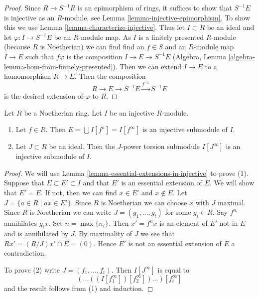 \begin{proof}
Since $R \to S^{-1}R$ is an epimorphism of rings, it suffices
to show that $S^{-1}E$ is injective as an $R$-module, see
Lemma \ref{lemma-injective-epimorphism}.
To show this we use Lemma \ref{lemma-characterize-injective}.
Thus let $I \subset R$ be an ideal and let
$\varphi : I \to S^{-1} E$ be an $R$-module map.
As $I$ is a finitely presented $R$-module (because $R$ is Noetherian)
we can find find an $f \in S$ and an $R$-module map $I \to E$
such that $f\varphi$ is the composition $I \to E \to S^{-1}E$
(Algebra, Lemma \ref{algebra-lemma-hom-from-finitely-presented}).
Then we can extend $I \to E$ to a homomorphism $R \to E$.
Then the composition
$$
R \to E \to S^{-1}E \xrightarrow{f^{-1}} S^{-1}E
$$
is the desired extension of $\varphi$ to $R$.
\end{proof}

\begin{lemma}
\label{lemma-injective-module-divide}
Let $R$ be a Noetherian ring. Let $I$ be an injective $R$-module.
\begin{enumerate}
\item Let $f \in R$. Then $E = \bigcup I[f^n] = I[f^\infty]$
is an injective submodule of $I$.
\item Let $J \subset R$ be an ideal. Then the $J$-power torsion
submodule $I[J^\infty]$ is an injective submodule of $I$.
\end{enumerate}
\end{lemma}

\begin{proof}
We will use Lemma \ref{lemma-essential-extensions-in-injective}
to prove (1).
Suppose that $E \subset E' \subset I$ and that $E'$ is an essential
extension of $E$. We will show that $E' = E$. If not, then we can
find $x \in E'$ and $x \not \in E$. Let $J = \{a \in R \mid ax \in E'\}$.
Since $R$ is Noetherian we can choose $x$ with $J$ maximal.
Since $R$ is Noetherian we can write $J = (g_1, \ldots, g_t)$ for some
$g_i \in R$. Say $f^{n_i}$ annihilates $g_ix$. Set $n = \max\{n_i\}$.
Then $x' = f^n x$ is an element of $E'$ not in $E$ and is annihilated
by $J$. By maximality of $J$ we see that $R x' = (R/J)x'  \cap E = (0)$.
Hence $E'$ is not an essential extension of $E$ a contradiction.

\medskip\noindent
To prove (2) write $J = (f_1, \ldots, f_t)$. Then
$I[J^\infty]$ is equal to
$$
(\ldots((I[f_1^\infty])[f_2^\infty])\ldots)[f_t^\infty]
$$
and the result follows from (1) and induction.
\end{proof}

